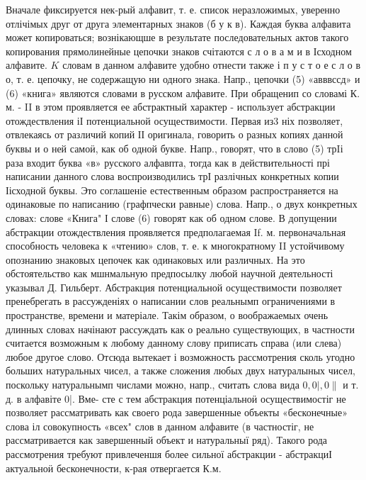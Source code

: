 \documentclass[10pt]{article}
\begin{document}
Вначале фиксируется нек-рый алфавит, т. е. список неразложимых, уверенно отлічімых друг от друга элементарных знаков (б у к в). Каждая буква алфавита может копироваться; вознікающше в результате последовательных актов такого копирования прямолинейные цепочки знаков счітаются с л о в а м и в Ісходном алфавите. $K$ словам в данном алфавите удобно отнести также і п у с т о е с л о в о, т. е. цепочку, не содержащую ни одного знака. Напр., цепочки (5) «авввссд» и (6) «книга» являются словами в русском алфавите. При обращенип со словамі К. м. - II в этом проявляется ее абстрактный характер - использует абстракции отождествления іІ потенциальной осуществимости. Первая из3 ніх позволяет, отвлекаясь от различий копий ІІ оригинала, говорить о разных копиях данной буквы и о ней самоӥ, как об одной букве. Напр., говорят, что в слово (5) трIі раза входит буква «в» русского алфавпта, тогда как в действительності прі написании данного слова воспроизводились трІ разлічных конкретных копии Іісходной буквы. Это соглашеніе естественным образом распространяется на одинаковые по написанию (графпчески равные) слова. Напр., о двух конкретных словах: слове «Книга" І слове (6) говорят как об одном слове. В допущении абстракции отождествления проявляется предполагаемая If. м. первоначальная способность человека к «чтению» слов, т. е. к многократному II устойчивому опознанию знаковых цепочек как одинаковых или различных. На это обстоятельство как мшнмальную предпосылку любой научной деятельності указывал Д. Гильберт. Абстракция потенциальной осуществимости позволяет пренебрегать в рассужденіях о написании слов реальнымп ограничениями в пространстве, времени и матеріале. Такім образом, о воображаемых очень длинных словах начінают рассуждать как о реально существующих, в частности считается возможным к любому данному слову приписать справа (или слева) любое другое слово. Отсюда вытекает і возможность рассмотрения сколь угодно больших натуральных чисел, а также сложения любых двух натуралыных чисел, поскольку натуральнымп числами можно, напр., считать слова вида $0,0 \mid, 0 \|$ и т. д. в алфавіте 0|. Вме- сте с тем абстракция потенціальноӥ осуществимостіг не позволяет рассматривать как своего рода завершенные объекты «бесконечные» слова іл совокупность «всех" слов в данном алфавите (в частностіг, не рассматривается как завершенный объект и натуральныї ряд). Такого рода рассмотрения требуют привлеченшя более сильної абстракции - абстракциІ актуальноӥ бесконечности, к-рая отвергается К.м.
\end{document}
